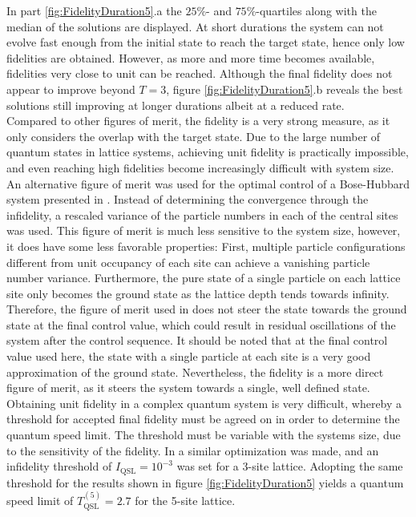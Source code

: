 In part \ref{fig:FidelityDuration5}.a the $25\%$- and $75\%$-quartiles along with the median of the solutions are displayed. At short durations the system can not evolve fast enough from the initial state to reach the target state, hence only low fidelities are obtained. However, as more and more time becomes available, fidelities very close to unit can be reached. Although the final fidelity does not appear to improve beyond $T=3$, figure \ref{fig:FidelityDuration5}.b reveals the best solutions still improving at longer durations albeit at a reduced rate.\\
Compared to other figures of merit, the fidelity is a very strong measure, as it only considers the overlap with the target state. Due to the large number of quantum states in lattice systems, achieving unit fidelity is practically impossible, and even reaching high fidelities become increasingly difficult with system size. An alternative figure of merit was used for the optimal control of a Bose-Hubbard system presented in \cite{FrankBloch}. Instead of determining the convergence through the infidelity, a rescaled variance of the particle numbers in each of the central sites was used. This figure of merit is much less sensitive to the system size, however, it does have some less favorable properties: First, multiple particle configurations different from unit occupancy of each site can achieve a vanishing particle number variance. Furthermore, the pure state of a single particle on each lattice site only becomes the ground state as the lattice depth tends towards infinity. Therefore, the figure of merit used in \cite{FrankBloch} does not steer the state towards the ground state at the final control value, which could result in residual oscillations of the system after the control sequence. It should be noted that at the final control value used here, the state with a single particle at each site is a very good approximation of the ground state.
Nevertheless, the fidelity is a more direct figure of merit, as it steers the system towards a single, well defined state.\\
Obtaining unit fidelity in a complex quantum system is very difficult, whereby a threshold for accepted final fidelity must be agreed on in order to determine the quantum speed limit. The threshold must be variable with the systems size, due to the sensitivity of the fidelity. In \cite{MajaJulie} a similar optimization was made, and an infidelity threshold of $I_{\mathrm{QSL}} = 10^{-3}$ was set for a 3-site lattice. Adopting the same threshold for the results shown in figure \ref{fig:FidelityDuration5} yields a quantum speed limit of $T_{\mathrm{QSL}}^{(5)} = 2.7$ for the 5-site lattice.\\

